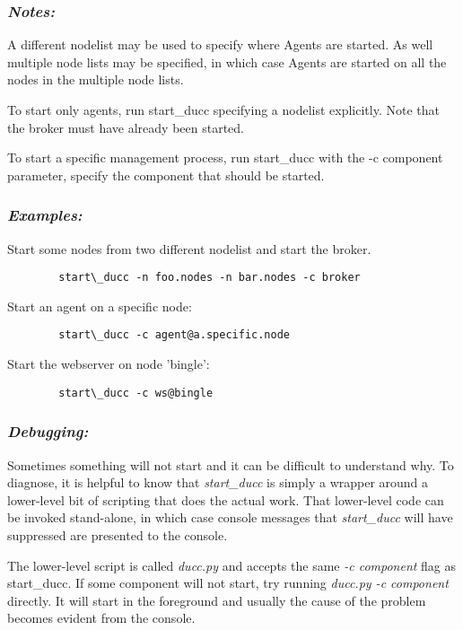       \subsubsection{{\em Notes: }}
      A different nodelist may be used to specify where Agents are started. As well multiple node 
      lists may be specified, in which case Agents are started on all the nodes in the multiple node 
      lists. 
      
      To start only agents, run start\_ducc specifying a nodelist explicitly. Note that the broker
      must have already been started.
      
      To start a specific management process, run start\_ducc with the -c component parameter, 
      specify the component that should be started. 
      
      \subsubsection{{\em Examples: }}

      Start some nodes from two different nodelist and start the broker.  
\begin{verbatim}
        start\_ducc -n foo.nodes -n bar.nodes -c broker
\end{verbatim}
                  
      Start an agent on a specific node: 
\begin{verbatim}
        start\_ducc -c agent@a.specific.node 
\end{verbatim}
      
      Start the webserver on node 'bingle': 
\begin{verbatim}
        start\_ducc -c ws@bingle 
\end{verbatim}

      \subsubsection{{\em Debugging:}}

      Sometimes something will not start and it can be difficult to understand why.  To diagnose, it is
      helpful to know that {\em start\_ducc} is simply a wrapper around a lower-level bit of scripting
      that does the actual work.  That lower-level code can be invoked stand-alone, in which case
      console messages that {\em start\_ducc} will have suppressed are presented to the console.

      The lower-level script is called {\em ducc.py} and accepts the same {\em -c component} flag as
      start\_ducc.  If some component will not start, try running {\em ducc.py -c component} directly.
      It will start in the foreground and usually the cause of the problem becomes evident from
      the console.

